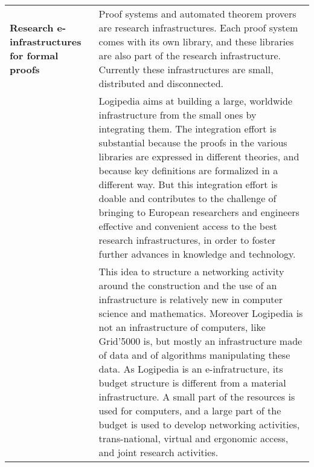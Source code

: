 \begin{longtable}{|p{}|p{}|}
\hline
{\bf Research \newline e-infrastructures for formal proofs}
&
Proof systems and automated theorem provers are research
infrastructures. Each proof system comes with its own library, and
these libraries are also part of the research infrastructure.  Currently
these infrastructures are small, distributed and disconnected.\\
&
\hspace{0.4cm}
Logipedia aims at building a large, worldwide infrastructure from the
small ones by integrating them.  The integration effort is substantial
because the proofs in the various libraries are expressed in different
theories, and because key definitions are formalized in a different
way.  But this integration effort is doable and contributes to the
challenge of bringing to European researchers and engineers effective and
convenient access to the best research infrastructures, in order to
foster further advances in knowledge and technology.\\
&
\hspace{0.4cm}
This idea to structure a networking activity around the construction
and the use of an infrastructure is relatively new in computer science
and mathematics. Moreover Logipedia is not an infrastructure of
computers, like Grid'5000 is, but mostly an infrastructure made of
data and of algorithms manipulating these data.  As Logipedia is an
e-infratructure, its budget structure is different from a material
infrastructure. A small part of the resources is used for computers,
and a large part of the budget is used to develop networking
activities, trans-national, virtual and ergonomic access, and joint
research activities.\\

\hline


\end{longtable}
